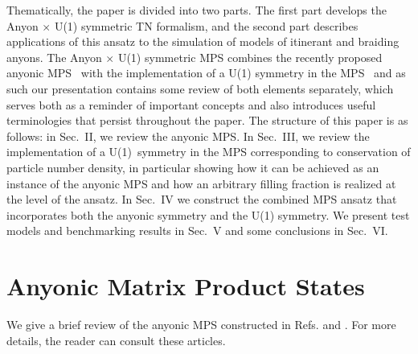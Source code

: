 \documentclass[aps,reprint,superscriptaddress,amsmath,amssymb,amsfonts,prb]{revtex4-1}
\begin{document}
{
Thematically, the paper is divided into two parts. The first part develops the Anyon $\times$ U(1) symmetric TN formalism, and the second part describes applications of this ansatz to the simulation of models of itinerant and braiding anyons. The Anyon $\times$ U(1) symmetric MPS combines the recently proposed anyonic MPS~\cite{Singh,Pfeifer2015} with the implementation of a U(1) symmetry in the MPS~\cite{singh2010,Singh2011} and as such our presentation contains some review of both elements separately, which serves both as a reminder of important concepts and also introduces useful terminologies that persist throughout the paper. The structure of this paper is as follows: in Sec.~II, we review the anyonic MPS. In Sec.~III, we review the implementation of a U(1)~symmetry in the MPS corresponding to conservation of particle number density, in particular showing how it can be achieved as an instance of the anyonic MPS and how an arbitrary filling fraction is realized at the level of the ansatz. In Sec.~IV we 
construct the combined MPS ansatz that incorporates both the anyonic symmetry and the U(1) symmetry. We present test models and benchmarking results in Sec.~V and some conclusions in Sec.~VI.
}


\section{Anyonic Matrix Product States\label{sec:AnyonicMPS}}
{We give a brief review of the anyonic MPS constructed in Refs.  and . For more details, the reader can consult these articles}. 
\end{document}
